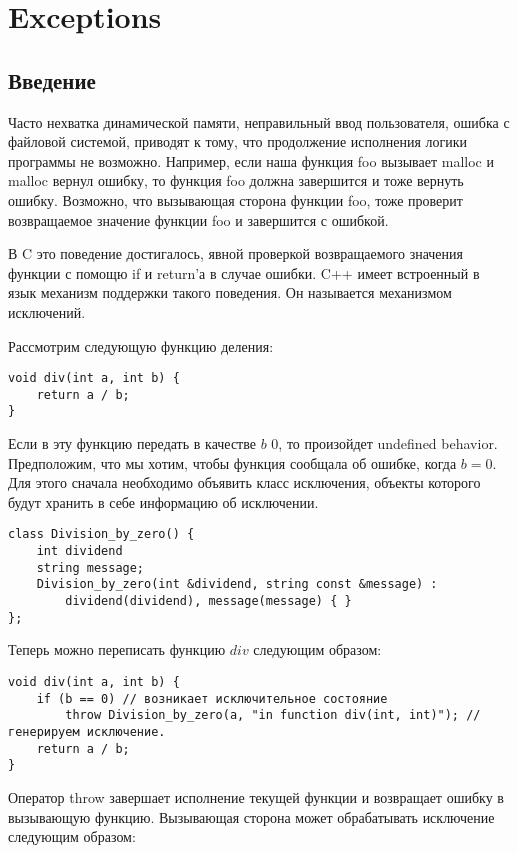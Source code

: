 \section{Exceptions}
\subsection{Введение}
Часто нехватка динамической памяти, неправильный ввод пользователя, ошибка с файловой системой, приводят к тому, что продолжение исполнения логики программы не возможно. Например, если наша функция foo вызывает malloc и malloc вернул ошибку, то функция foo должна завершится и тоже вернуть ошибку. Возможно, что вызывающая сторона функции foo, тоже проверит возвращаемое значение функции foo и завершится с ошибкой.

В C это поведение достигалось, явной проверкой возвращаемого значения функции с помощю if и return'а в случае ошибки. C++ имеет встроенный в язык механизм поддержки такого поведения. Он называется механизмом исключений.

Рассмотрим следующую функцию деления:
\begin{verbatim}
void div(int a, int b) {
    return a / b;
}
\end{verbatim}

Если в эту функцию передать в качестве $b$ $0$, то произойдет undefined behavior. Предположим, что мы хотим, чтобы функция сообщала об ошибке, когда $b = 0$. Для этого сначала необходимо объявить класс исключения, объекты которого будут хранить в себе информацию об исключении.

\begin{verbatim}
class Division_by_zero() {
    int dividend
    string message;
    Division_by_zero(int &dividend, string const &message) :
        dividend(dividend), message(message) { }
};
\end{verbatim}

Теперь можно переписать функцию $div$ следующим образом:

\begin{verbatim}
void div(int a, int b) {
    if (b == 0) // возникает исключительное состояние
        throw Division_by_zero(a, "in function div(int, int)"); // генерируем исключение.
    return a / b;
}
\end{verbatim}

Оператор throw завершает исполнение текущей функции и возвращает ошибку в вызывающую функцию. Вызывающая сторона может обрабатывать исключение следующим образом:

